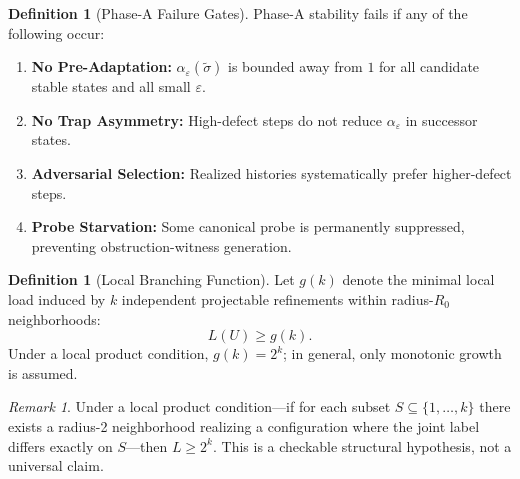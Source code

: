 \documentclass[11pt,a4paper]{article}
\theoremstyle{definition}
\newtheorem{definition}[theorem]{Definition}
\theoremstyle{remark}
\newtheorem{remark}[theorem]{Remark}
\begin{document}
\begin{definition}[Phase-A Failure Gates]\label{def:failgates}
Phase-A stability fails if any of the following occur:
\begin{enumerate}[label=(F\arabic*)]
  \item \textbf{No Pre-Adaptation:} $\alpha_\varepsilon(\tilde{\sigma})$ is bounded away from $1$ for all candidate stable states and all small $\varepsilon$.
  \item \textbf{No Trap Asymmetry:} High-defect steps do not reduce $\alpha_\varepsilon$ in successor states.
  \item \textbf{Adversarial Selection:} Realized histories systematically prefer higher-defect steps.
  \item \textbf{Probe Starvation:} Some canonical probe is permanently suppressed, preventing obstruction-witness generation.
\end{enumerate}
\end{definition}

\begin{definition}[Local Branching Function]\label{def:branch}
Let $g(k)$ denote the minimal local load induced by $k$ independent projectable refinements within radius-$R_0$ neighborhoods:
\[
  L(U) \geq g(k).
\]
Under a local product condition, $g(k) = 2^k$; in general, only monotonic growth is assumed.
\end{definition}

\begin{remark}\label{rem:product}
Under a local product condition---if for each subset $S \subseteq \{1, \dots, k\}$ there exists a radius-2 neighborhood realizing a configuration where the joint label differs exactly on $S$---then $L \geq 2^k$. This is a checkable structural hypothesis, not a universal claim.
\end{remark}
\end{document}
